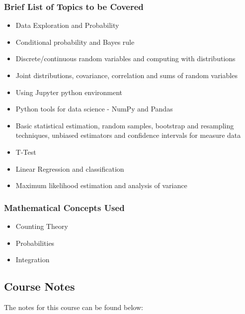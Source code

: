 {\begin{highlight}[\CSPBDataSci]
        \subsubsection*{Brief List of Topics to be Covered}
    
        \begin{itemize}
            \item Data Exploration and Probability
            \item Conditional probability and Bayes rule
            \item Discrete/continuous random variables and computing with distributions
            \item Joint distributions, covariance, correlation and sums of random variables
            \item Using Jupyter python environment
            \item Python tools for data science - NumPy and Pandas
            \item Basic statistical estimation, random samples, bootstrap and resampling techniques, unbiased estimators and confidence intervals for measure data
            \item T-Test
            \item Linear Regression and classification
            \item Maximum likelihood estimation and analysis of variance
        \end{itemize}
        
        \subsubsection*{Mathematical Concepts Used}
        
        \begin{itemize}
            \item Counting Theory
            \item Probabilities
            \item Integration
        \end{itemize}
    \end{highlight}
}

\subsection{Course Notes}

The notes for this course can be found below: 

